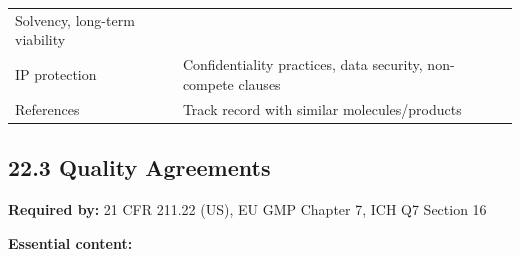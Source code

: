 \documentclass[
  11pt,
  a4paper,
]{report}
\begin{document}
\begin{longtable}[]{@{}ll@{}}
\begin{minipage}[t]{0.47\columnwidth}
Solvency, long-term viability\strut
\end{minipage}\tabularnewline
\begin{minipage}[t]{0.47\columnwidth}\raggedright
IP protection\strut
\end{minipage} & \begin{minipage}[t]{0.47\columnwidth}\raggedright
Confidentiality practices, data security, non-compete clauses\strut
\end{minipage}\tabularnewline
\begin{minipage}[t]{0.47\columnwidth}\raggedright
References\strut
\end{minipage} & \begin{minipage}[t]{0.47\columnwidth}\raggedright
Track record with similar molecules/products\strut
\end{minipage}\tabularnewline
\bottomrule
\end{longtable}

\hypertarget{quality-agreements}{%
\subsection{22.3 Quality Agreements}\label{quality-agreements}}

\textbf{Required by:} 21 CFR 211.22 (US), EU GMP Chapter 7, ICH Q7
Section 16

\textbf{Essential content:}
\end{document}
